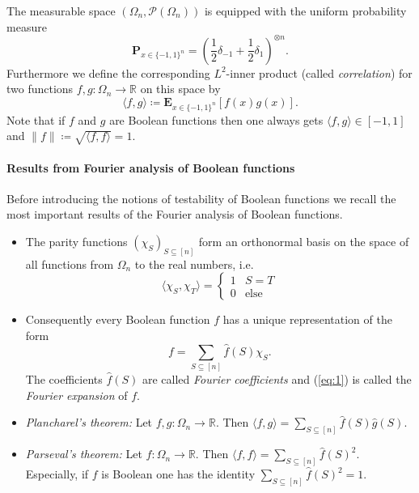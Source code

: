 \documentclass[a4paper]{article}
\newcommand{\prob}{\mathbf{P}}
\newcommand{\expe}{\mathbf{E}}
\newcommand{\real}{\mathbb{R}}
\newcommand{\nset}{[n]}
\theoremstyle{plain}
\theoremstyle{definition}
\theoremstyle{remark}
\begin{document}
\noindent The measurable space \(\left(\Omega_n, \mathcal{P}(\Omega_n)\right)\)
is equipped with the uniform probability measure \[\prob_{x \in
  \{-1,1\}^n} = \left(\frac{1}{2} \delta_{-1} +
  \frac{1}{2}\delta_1\right)^{\otimes n}.\]
Furthermore we define the corresponding \(L^2\)-inner product (called \emph{correlation}) for two
functions \(f,g: \Omega_n \rightarrow \real\) on this space by 
\[\langle f,g\rangle \coloneqq \expe_{x \in
  \{-1,1\}^n}\left[f(x)g(x)\right].\]
Note that if \(f\) and \(g\) are Boolean functions then one always
gets \(\langle f, g\rangle \in [-1,1]\) and \(\|f\| \coloneqq
\sqrt{\langle f, f\rangle } = 1\).  

\paragraph{Results from Fourier analysis of Boolean functions}
\label{sec:results-from-fourier}

Before introducing the notions of testability of Boolean functions we
recall the most important results of the Fourier analysis of Boolean
functions. 
\begin{itemize}
\item The parity functions \(\left(\chi_S\right)_{S \subseteq \nset}\)
  form an orthonormal basis on the space of all functions from
  \(\Omega_n\) to the real numbers, i.e. 
  \[\langle \chi_S, \chi_T\rangle =  \begin{cases}
    1 & S=T \\
    0 & \text{else}
  \end{cases}\]
\item Consequently every Boolean function \(f\) has a unique
  representation of the form 
  \begin{equation}
    \label{eq:1}
    f = \sum_{S\subseteq \nset} \hat{f}(S) \chi_S.
  \end{equation}
  The coefficients \(\hat{f}(S)\) are called \emph{Fourier
    coefficients} and (\ref{eq:1}) is called the \emph{Fourier
    expansion} of \(f\).
\item \emph{Plancharel's theorem:} Let \(f,g: \Omega_n \rightarrow
  \real\). Then \(\langle f, g\rangle = \sum_{S\subseteq \nset}
  \hat{f}(S)\hat{g}(S)\).
\item \emph{Parseval's theorem:} Let \(f: \Omega_n \rightarrow
  \real\). Then \(\langle f, f\rangle = \sum_{S\subseteq \nset}
  \hat{f}(S)^2\). Especially, if \(f\) is Boolean one has the identity \(\sum_{S\subseteq \nset}
  \hat{f}(S)^2 = 1\). 
\end{itemize}
\end{document}
